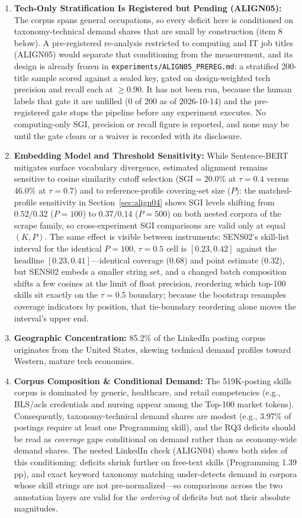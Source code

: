 \documentclass[journal]{IEEEtran}
\begin{document}
\begin{enumerate}
    \item \textbf{Tech-Only Stratification Is Registered but Pending (ALIGN05):} The corpus spans general occupations, so every deficit here is conditioned on taxonomy-technical demand shares that are small by construction (item 8 below). A pre-registered re-analysis restricted to computing and IT job titles (ALIGN05) would separate that conditioning from the measurement, and its design is already frozen in \texttt{experiments/ALIGN05\_PREREG.md}: a stratified 200-title sample scored against a sealed key, gated on design-weighted tech precision and recall each at $\geq 0.90$. It has not been run, because the human labels that gate it are unfilled (0 of 200 as of 2026-10-14) and the pre-registered gate stops the pipeline before any experiment executes. No computing-only SGI, precision or recall figure is reported, and none may be until the gate clears or a waiver is recorded with its disclosure.
    \item \textbf{Embedding Model and Threshold Sensitivity:} While Sentence-BERT mitigates surface vocabulary divergence, estimated alignment remains sensitive to cosine similarity cutoff selection ($\text{SGI} = 20.0\%$ at $\tau = 0.4$ versus $46.0\%$ at $\tau = 0.7$) and to reference-profile covering-set size ($P$): the matched-profile sensitivity in Section~\ref{sec:align04} shows SGI levels shifting from $0.52/0.32$ ($P = 100$) to $0.37/0.14$ ($P = 500$) on both nested corpora of the scrape family, so cross-experiment SGI comparisons are valid only at equal $(K, P)$. The same effect is visible between instruments: SENS02's skill-list interval for the identical $P = 100$, $\tau = 0.5$ cell is $[0.23, 0.42]$ against the headline $[0.23, 0.41]$---identical coverage ($0.68$) and point estimate ($0.32$), but SENS02 embeds a smaller string set, and a changed batch composition shifts a few cosines at the limit of float precision, reordering which top-100 skills sit exactly on the $\tau = 0.5$ boundary; because the bootstrap resamples coverage indicators by position, that tie-boundary reordering alone moves the interval's upper end.
    \item \textbf{Geographic Concentration:} 85.2\% of the LinkedIn posting corpus originates from the United States, skewing technical demand profiles toward Western, mature tech economies.
    \item \textbf{Corpus Composition \& Conditional Demand:} The 519K-posting skills corpus is dominated by generic, healthcare, and retail competencies (e.g., BLS/acls credentials and nursing appear among the Top-100 market tokens). Consequently, taxonomy-technical demand shares are modest (e.g., 3.97\% of postings require at least one Programming skill), and the RQ3 deficits should be read as \textit{coverage} gaps conditional on demand rather than as economy-wide demand shares. The nested LinkedIn check (ALIGN04) shows both sides of this conditioning: deficits shrink further on free-text skills (Programming 1.39 pp), and exact keyword taxonomy matching under-detects demand in corpora whose skill strings are not pre-normalized---so comparisons across the two annotation layers are valid for the \textit{ordering} of deficits but not their absolute magnitudes.

\end{enumerate}
\end{document}
